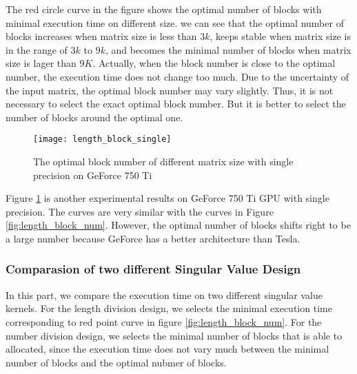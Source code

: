 The red circle curve in the figure shows the optimal number of blocks with minimal execution time on different size.
we can see that the optimal number of blocks increases when matrix size is less than $3k$,
keeps stable when matrix size is in the range of $3k$ to $9k$,
and becomes the minimal number of blocks when matrix size is lager than $9K$.
Actually, when the block number is close to the optimal number, the execution time does not change too much.
Due to the uncertainty of the input matrix, the optimal block number may vary slightly.
Thus, it is not necessary to select the exact optimal block number.
But it is better to select the number of blocks around the optimal one.

\begin{figure}[hbpt]
\centering
\texttt{[image: length\_block\_single]}
\caption{The optimal block number of different matrix size with single precision on GeForce 750 Ti}
\label{fig:length_block_single}
\end{figure}
Figure \ref{fig:length_block_single} is another experimental results on GeForce 750 Ti GPU with single precision.
The curves are very similar with the curves in Figure \ref{fig:length_block_num}.
However, the optimal number of blocks shifts right to be a large number because GeForce has a better architecture than Tesla.


\subsubsection{Comparasion of two different Singular Value Design}
In this part, we compare the execution time on two different singular value kernels.
For the length division design, we selects the minimal execution time corresponding to red point curve in figure \ref{fig:length_block_num}.
For the number division design, we selects the minimal number of blocks that is able to allocated, since the execution time does not vary much between the minimal number of blocks and the optimal nubmer of blocks.

